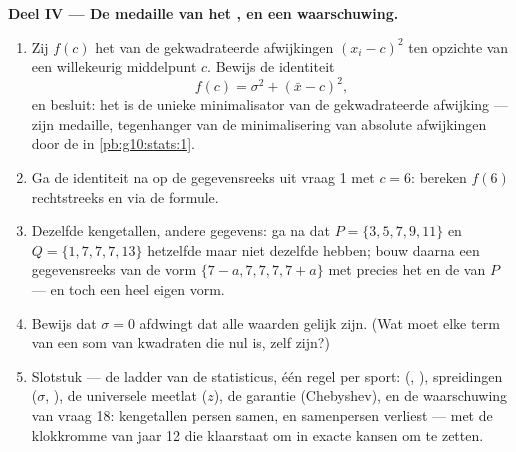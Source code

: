 \begin{problem}
\medskip
\noindent\textbf{Deel IV --- De medaille van het , en een
waarschuwing.}
\begin{enumerate}[resume]
  \item Zij $f(c)$ het  van de gekwadrateerde afwijkingen
        $(x_i - c)^2$ ten opzichte van een willekeurig middelpunt $c$. Bewijs
        de identiteit
        \[
        f(c) = \sigma^2 + (\bar x - c)^2 ,
        \]
        en besluit: het  is de unieke minimalisator van de
         gekwadrateerde afwijking --- zijn medaille, tegenhanger van
        de minimalisering van absolute afwijkingen door de  in
        \cref{pb:g10:stats:1}.
  \item Ga de identiteit na op de gegevensreeks uit vraag 1 met $c = 6$:
        bereken $f(6)$ rechtstreeks en via de formule.
  \item Dezelfde kengetallen, andere gegevens: ga na dat
        $P = \{3, 5, 7, 9, 11\}$ en $Q = \{1, 7, 7, 7, 13\}$ hetzelfde
         maar niet dezelfde  hebben; bouw daarna een
        gegevensreeks van de vorm $\{7 - a, 7, 7, 7, 7 + a\}$ met precies het
         en de  van $P$ --- en toch een heel eigen vorm.
  \item Bewijs dat $\sigma = 0$ afdwingt dat alle waarden gelijk zijn. (Wat
        moet elke term van een som van kwadraten die nul is, zelf zijn?)
  \item Slotstuk --- de ladder van de statisticus, één regel per sport:
         (, ), spreidingen ($\sigma$,
        ), de universele meetlat ($z$), de garantie
        (Chebyshev), en de waarschuwing van vraag 18: kengetallen persen
        samen, en samenpersen verliest --- met de klokkromme van jaar 12 die
        klaarstaat om  in exacte kansen om te zetten.
\end{enumerate}
\end{problem}
